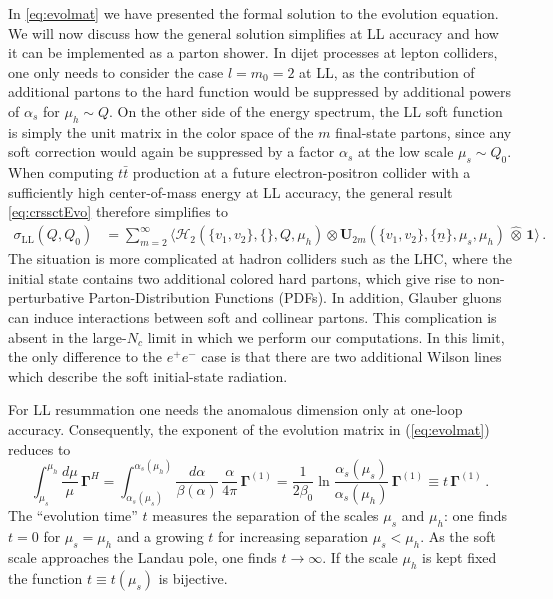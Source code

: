 \documentclass[11pt,a4paper]{article}
\begin{document}
In \eqref{eq:evolmat} we have presented the formal solution to the evolution equation. We will now discuss how the general solution simplifies at LL accuracy and how it can be implemented as a parton shower. 
In dijet processes at lepton colliders, one only needs to consider the case $l=m_0=2$ at LL,  as the contribution of additional partons to the hard function would be suppressed by additional powers of $\alpha_s$ for $\mu_h\sim Q$. On the other side of the energy spectrum, the LL soft function is simply the unit matrix in the color space of the $m$ final-state partons, since any soft correction would again be suppressed by a factor $\alpha_s$ at the low scale $\mu_s \sim Q_0$. When computing $t\bar{t}$ production at a future electron-positron collider with a sufficiently high center-of-mass energy at LL accuracy, the general result  \eqref{eq:crssctEvo} therefore simplifies to
\begin{align} 
\sigma_{\text{LL}}(Q, Q_0) &=\sum_{m=2}^\infty \big\langle \bm{\mathcal{H}}_2(\{v_1,v_2\},\{\},Q,\mu_h) 
\otimes  \bm{U}_{2m}(\{v_1,v_2\},\{\underline{n}\},\mu_s,\mu_h)\,\hat{\otimes}\, 
\bm{1} \big\rangle\,.
\end{align}
The situation is more complicated at hadron colliders such as the LHC, where the initial state contains two additional colored hard partons, which give rise to non-perturbative Parton-Distribution Functions (PDFs). In addition, Glauber gluons can induce interactions between soft and collinear partons. This complication is absent in the large-$N_c$ limit in which we perform our computations. In this limit, the only difference to the $e^+e^-$ case is that there are two additional Wilson lines which describe the soft initial-state radiation. 

For LL resummation one needs the anomalous dimension only at one-loop accuracy. Consequently, the exponent of the evolution matrix in (\ref{eq:evolmat}) reduces to
\begin{equation}\label{eq:evolutiontime}
\int_{\mu_s}^{\mu_h} \frac{d\mu}{\mu}\, \bm{\Gamma}^H= \int_{\alpha_s(\mu_s)}^{\alpha_s(\mu_h)} \frac{d\alpha}{\beta(\alpha)}\, \frac{\alpha}{4\pi}\,\bm{\Gamma}^{(1)}=  \frac{1}{2\beta_0}\ln\frac{\alpha_s(\mu_s)}{\alpha_s(\mu_h)} \,\bm{\Gamma}^{(1)}  \equiv t \,\bm{\Gamma}^{(1)}  \,.
\end{equation}
The ``evolution time'' $t$ measures the separation of the scales $\mu_s$ and $\mu_h$: one finds  $t=0$ for $\mu_s=\mu_h$ and a growing $t$ for increasing separation $\mu_s<\mu_h$. As the soft scale approaches the Landau pole, one finds $t\rightarrow\infty$. If the scale  $\mu_h$ is kept fixed the function $t\equiv t(\mu_s)$ is bijective.
\end{document}
